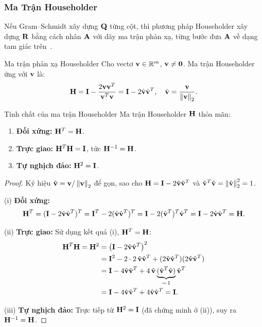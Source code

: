 \subsubsection{Ma Trận Householder}

Nếu Gram--Schmidt xây dựng $\mathbf{Q}$ từng cột, thì phương pháp Householder xây dựng
$\mathbf{R}$ bằng cách nhân $\mathbf{A}$ với dãy ma trận phản xạ, từng bước đưa $\mathbf{A}$
về dạng tam giác trên~\cite{golub2013}.

\begin{mydef}{Ma trận phản xạ Householder}{}
Cho vectơ $\mathbf{v} \in \mathbb{R}^m$, $\mathbf{v} \neq \mathbf{0}$. Ma trận Householder ứng với
$\mathbf{v}$ là:
\[
    \mathbf{H} = \mathbf{I} - \frac{2\mathbf{v}\mathbf{v}^T}{\mathbf{v}^T\mathbf{v}} = \mathbf{I} - 2\hat{\mathbf{v}}\hat{\mathbf{v}}^T,
    \quad \hat{\mathbf{v}} = \frac{\mathbf{v}}{\left\lVert\mathbf{v}\right\rVert_2}.
\]
\end{mydef}

\begin{mythm}{Tính chất của ma trận Householder}{}
Ma trận Householder $\mathbf{H}$ thỏa mãn:
\begin{enumerate}[label=(\roman*)]
    \item \textbf{Đối xứng:} $\mathbf{H}^T = \mathbf{H}$.
    \item \textbf{Trực giao:} $\mathbf{H}^T\mathbf{H} = \mathbf{I}$, tức $\mathbf{H}^{-1} = \mathbf{H}$.
    \item \textbf{Tự nghịch đảo:} $\mathbf{H}^2 = \mathbf{I}$.
\end{enumerate}
\end{mythm}

\begin{proof}
Ký hiệu $\hat{\mathbf{v}} = \mathbf{v}/\left\lVert\mathbf{v}\right\rVert_2$ để gọn, sao cho
$\mathbf{H} = \mathbf{I} - 2\hat{\mathbf{v}}\hat{\mathbf{v}}^T$ và
$\hat{\mathbf{v}}^T\hat{\mathbf{v}} = \left\lVert\hat{\mathbf{v}}\right\rVert_2^2 = 1$.

\medskip
\noindent(i) \textbf{Đối xứng:}
\[
    \mathbf{H}^T = (\mathbf{I} - 2\hat{\mathbf{v}}\hat{\mathbf{v}}^T)^T
    = \mathbf{I}^T - 2(\hat{\mathbf{v}}\hat{\mathbf{v}}^T)^T
    = \mathbf{I} - 2(\hat{\mathbf{v}}^T)^T\hat{\mathbf{v}}^T
    = \mathbf{I} - 2\hat{\mathbf{v}}\hat{\mathbf{v}}^T = \mathbf{H}.
\]

\noindent(ii) \textbf{Trực giao:} Sử dụng kết quả (i), $\mathbf{H}^T = \mathbf{H}$:
\begin{align*}
    \mathbf{H}^T\mathbf{H} = \mathbf{H}^2
    &= \left(\mathbf{I} - 2\hat{\mathbf{v}}\hat{\mathbf{v}}^T\right)^2 \\
    &= \mathbf{I}^2 - 2\cdot 2\,\hat{\mathbf{v}}\hat{\mathbf{v}}^T
       + (2\hat{\mathbf{v}}\hat{\mathbf{v}}^T)(2\hat{\mathbf{v}}\hat{\mathbf{v}}^T) \\
    &= \mathbf{I} - 4\hat{\mathbf{v}}\hat{\mathbf{v}}^T
       + 4\,\hat{\mathbf{v}}\underbrace{(\hat{\mathbf{v}}^T\hat{\mathbf{v}})}_{=\,1}\hat{\mathbf{v}}^T \\
    &= \mathbf{I} - 4\hat{\mathbf{v}}\hat{\mathbf{v}}^T + 4\hat{\mathbf{v}}\hat{\mathbf{v}}^T
    = \mathbf{I}.
\end{align*}

\noindent(iii) \textbf{Tự nghịch đảo:} Trực tiếp từ $\mathbf{H}^2 = \mathbf{I}$ (đã chứng
minh ở (ii)), suy ra $\mathbf{H}^{-1} = \mathbf{H}$.
\end{proof}


